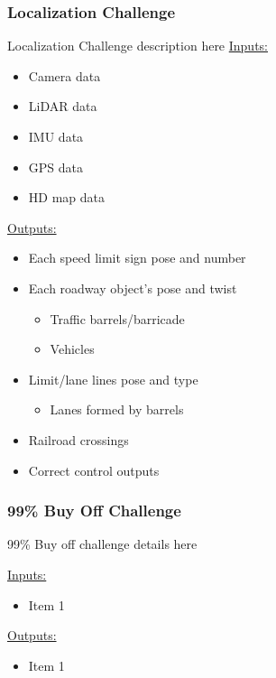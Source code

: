 \documentclass[12pt]{article}
\begin{document}
\subsubsection{Localization Challenge}
Localization Challenge description here 
\underline{Inputs:}
\begin{itemize}
    \item Camera data
    \item LiDAR data
    \item IMU data
    \item GPS data
    \item HD map data
\end{itemize}
\underline{Outputs:}
\begin{itemize}
    \item Each speed limit sign pose and number
    \item Each roadway object's pose and twist
    \begin{itemize}
        \item Traffic barrels/barricade
        \item Vehicles
    \end{itemize}
    \item Limit/lane lines pose and type
    \begin{itemize}
        \item Lanes formed by barrels
    \end{itemize}
    \item Railroad crossings
    \item Correct control outputs
\end{itemize}

\subsubsection{99\% Buy Off Challenge}
99\% Buy off challenge details here 

\underline{Inputs:}
\begin{itemize}
    \item Item 1
\end{itemize}
\underline{Outputs:}
\begin{itemize}
    \item Item 1
\end{itemize}

\end{document}
